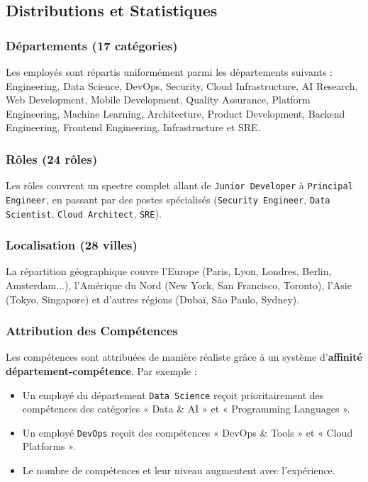 \documentclass[12pt,a4paper]{article}
\begin{document}
\subsection{Distributions et Statistiques}

\subsubsection{Départements (17 catégories)}

Les employés sont répartis uniformément parmi les départements suivants : Engineering, Data Science, DevOps, Security, Cloud Infrastructure, AI Research, Web Development, Mobile Development, Quality Assurance, Platform Engineering, Machine Learning, Architecture, Product Development, Backend Engineering, Frontend Engineering, Infrastructure et SRE.

\subsubsection{Rôles (24 rôles)}

Les rôles couvrent un spectre complet allant de \texttt{Junior Developer} à \texttt{Principal Engineer}, en passant par des postes spécialisés (\texttt{Security Engineer}, \texttt{Data Scientist}, \texttt{Cloud Architect}, \texttt{SRE}).

\subsubsection{Localisation (28 villes)}

La répartition géographique couvre l'Europe (Paris, Lyon, Londres, Berlin, Amsterdam...), l'Amérique du Nord (New York, San Francisco, Toronto), l'Asie (Tokyo, Singapore) et d'autres régions (Dubaï, São Paulo, Sydney).

\subsubsection{Attribution des Compétences}

Les compétences sont attribuées de manière réaliste grâce à un système d'\textbf{affinité département-compétence}. Par exemple :
\begin{itemize}[leftmargin=*, label=--]
    \item Un employé du département \texttt{Data Science} reçoit prioritairement des compétences des catégories « Data \& AI » et « Programming Languages ».
    \item Un employé \texttt{DevOps} reçoit des compétences « DevOps \& Tools » et « Cloud Platforms ».
    \item Le nombre de compétences et leur niveau augmentent avec l'expérience.
\end{itemize}
\end{document}
